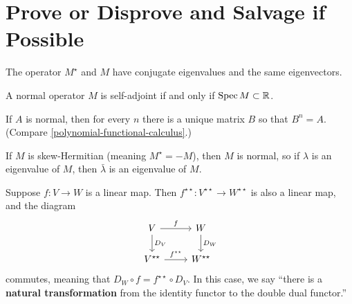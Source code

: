 \documentclass{homework}
\begin{document}
\section{Prove or Disprove and Salvage if Possible}

\begin{problem}%
  The operator $M^\star$ and $M$ have conjugate eigenvalues and the same eigenvectors.
\end{problem}

\begin{problem}
  A normal operator $M$ is self-adjoint if and only if $\operatorname{Spec} M \subset \mathbb{R}$.
\end{problem}

\begin{problem}%
  If $A$ is normal, then for every $n$ there is a unique matrix $B$ so that $B^n = A$.  (Compare \ref{polynomial-functional-calculus}.)
\end{problem}

\begin{problem}%
  If $M$ is skew-Hermitian (meaning $M^\star = -M$), then $M$ is
  normal, so if $\lambda$ is an eigenvalue of $M$, then
  $\bar{\lambda}$ is an eigenvalue of $M$.
\end{problem}

\begin{problem}
  Suppose $f : V \to W$ is a linear map.  Then $f^{\star\star} : V^{\star\star} \to W^{\star\star}$ is also a linear map, and the diagram
  \[\begin{tikzcd}
      V \arrow{r}{f} \arrow{d}{D_V} & W \arrow{d}{D_W} \\
      V^{\star\star} \arrow{r}{f^{\star\star}}  & W^{\star\star}
    \end{tikzcd}\] commutes, meaning that
  $D_W \circ f = f^{\star\star} \circ D_V$.  In this case, we say
  ``there is a \textbf{natural transformation} from the identity
  functor to the double dual functor.''
\end{problem}
\end{document}
